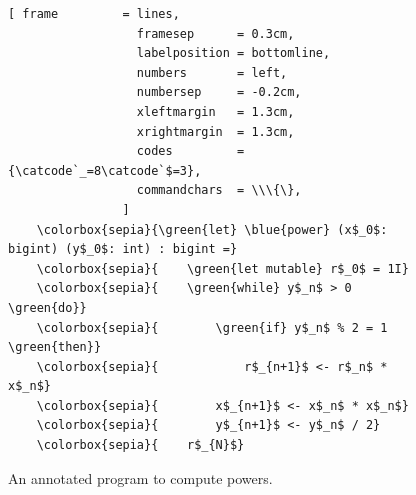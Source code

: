 \begin{figure}[!h]
\centering
\begin{Verbatim}[ frame         = lines, 
                  framesep      = 0.3cm, 
                  labelposition = bottomline,
                  numbers       = left,
                  numbersep     = -0.2cm,
                  xleftmargin   = 1.3cm,
                  xrightmargin  = 1.3cm,
                  codes         = {\catcode`_=8\catcode`$=3},
                  commandchars  = \\\{\},
                ]
    \colorbox{sepia}{\green{let} \blue{power} (x$_0$: bigint) (y$_0$: int) : bigint =}
    \colorbox{sepia}{    \green{let mutable} r$_0$ = 1I}
    \colorbox{sepia}{    \green{while} y$_n$ > 0 \green{do}}
    \colorbox{sepia}{        \green{if} y$_n$ % 2 = 1 \green{then}}
    \colorbox{sepia}{            r$_{n+1}$ <- r$_n$ * x$_n$}
    \colorbox{sepia}{        x$_{n+1}$ <- x$_n$ * x$_n$}
    \colorbox{sepia}{        y$_{n+1}$ <- y$_n$ / 2}
    \colorbox{sepia}{    r$_{N}$}
\end{Verbatim}
\vspace*{-0.3cm}
\caption{An annotated program to compute powers.}
\label{fig:power-iterative-annotated.stlx}
\end{figure} %

